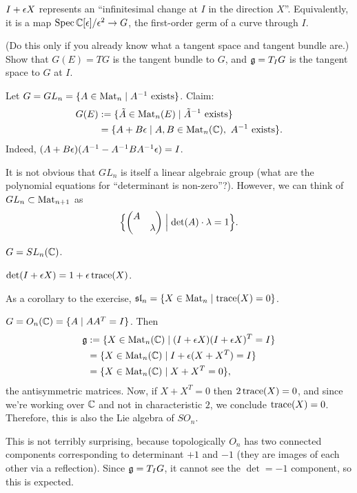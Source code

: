\begin{remark}
$I + \epsilon X$ represents an ``infinitesimal change at $I$ in the direction
$X$''. Equivalently, it is a map $\operatorname{Spec} \mathbb{C}[\epsilon]/\epsilon^2 \to G$, the
first-order germ of a curve through $I$.
\end{remark}

\begin{exercise}
(Do this only if you already know what a tangent space and tangent bundle
are.) Show that $G(E) = TG$ is the tangent bundle to $G$, and $\mathfrak{g} = T_IG$ is
the tangent space to $G$ at $I$.
\end{exercise}

\begin{example}
Let $G = GL_n = \{A \in \operatorname{Mat}_n \mid A^{-1} \text{ exists}\}$.
Claim:
\begin{align*}
  G(E) &:= \{\tilde A \in \operatorname{Mat}_n(E) \mid \tilde A^{-1} \text{ exists}\}\\
       &= \{A + B\epsilon \mid A, B \in \operatorname{Mat}_n(\mathbb{C}),\ A^{-1} \text{ exists}\}.
\end{align*}
Indeed, $(A + B\epsilon)(A^{-1} - A^{-1}BA^{-1}\epsilon) = I$.
\end{example}

\begin{remark}
It is not obvious that $GL_n$ is itself a linear algebraic group (what are the
polynomial equations for ``determinant is non-zero''?). However, we can think
of $GL_n \subset \operatorname{Mat}_{n+1}$ as
\[
  \Bigl\{ \begin{pmatrix} A & \\ & \lambda \end{pmatrix}
     \Bigm| \det(A) \cdot \lambda = 1 \Bigr\}.
\]
\end{remark}

\begin{example}
$G = SL_n(\mathbb{C})$.
\end{example}

\begin{exercise}
$\det(I + \epsilon X) = 1 + \epsilon \operatorname{trace}(X)$.
\end{exercise}

As a corollary to the exercise, $\mathfrak{sl}_n = \{X \in \operatorname{Mat}_n \mid \operatorname{trace}(X) = 0\}$.

\begin{example}
$G = O_n(\mathbb{C}) = \{A \mid AA^T = I\}$. Then
\begin{align*}
  \mathfrak{g} &:= \{X \in \operatorname{Mat}_n(\mathbb{C}) \mid (I + \epsilon X)(I + \epsilon X)^T = I\}\\
     &= \{X \in \operatorname{Mat}_n(\mathbb{C}) \mid I + \epsilon(X + X^T) = I\}\\
     &= \{X \in \operatorname{Mat}_n(\mathbb{C}) \mid X + X^T = 0\},
\end{align*}
the antisymmetric matrices. Now, if $X + X^T = 0$ then $2\operatorname{trace}(X) = 0$, and
since we're working over $\mathbb{C}$ and not in characteristic $2$, we conclude
$\operatorname{trace}(X) = 0$. Therefore, this is also the Lie algebra of $SO_n$.

This is not terribly surprising, because topologically $O_n$ has two connected
components corresponding to determinant $+1$ and $-1$ (they are images of each
other via a reflection). Since $\mathfrak{g} = T_IG$, it cannot see the $\det = -1$
component, so this is expected.
\end{example}

